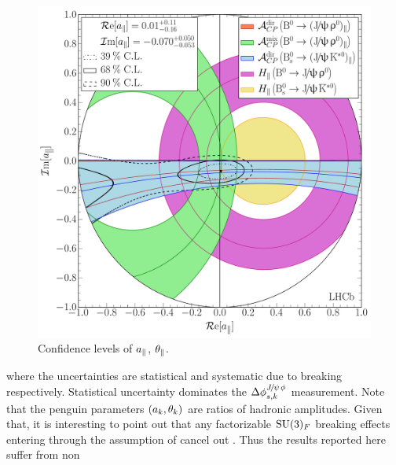 \begin{figure}[t!]
\centering
  \includegraphics[trim=0.0cm 0.0cm 0.0cm 0.0cm, clip=true,scale=0.39]{Figures/Chapter5/Penguin_Contribution_Re_vs_Im_allB2VV_Para_withH.pdf}
  \caption{Confidence levels of $a_{\parallel}$, $\theta_{\parallel}$.}
  \label{pengPlot_para}
\end{figure}

\noindent where the uncertainties are statistical and systematic due to \grpsuthree breaking respectively.
Statistical uncertainty dominates the $\Delta\phi^{{J\mskip -3mu/\mskip -2mu\psi\mskip 2mu}\phi}_{s,{k}}$ measurement.
Note that the penguin parameters $(a_k,\theta_k)$ are ratios of hadronic amplitudes.
Given that, it is interesting to point out that any factorizable $\mathrm{SU}(3)_F$ breaking
effects entering through the assumption of  cancel out \cite{Fleischer:1999zi}.
Thus the results reported here suffer from non

